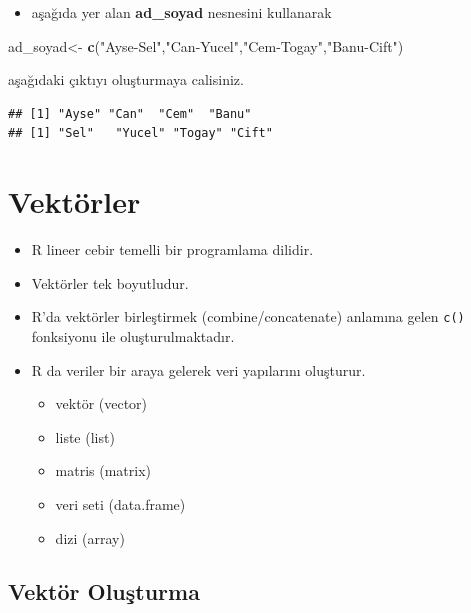 \documentclass[
  oneside]{book}
\newenvironment{Shaded}{\begin{snugshade}}{\end{snugshade}}
\newcommand{\FunctionTok}[1]{\textcolor[rgb]{0.13,0.29,0.53}{\textbf{#1}}}
\newcommand{\NormalTok}[1]{#1}
\newcommand{\OtherTok}[1]{\textcolor[rgb]{0.56,0.35,0.01}{#1}}
\newcommand{\StringTok}[1]{\textcolor[rgb]{0.31,0.60,0.02}{#1}}
\providecommand{\tightlist}{%
  \setlength{\itemsep}{0pt}\setlength{\parskip}{0pt}}
\begin{document}
\begin{itemize}
\tightlist
\item
  aşağıda yer alan \textbf{ad\_soyad} nesnesini kullanarak
\end{itemize}

\begin{Shaded}
\begin{Highlighting}[]
\NormalTok{ad\_soyad}\OtherTok{\textless{}{-}} \FunctionTok{c}\NormalTok{(}\StringTok{"Ayse{-}Sel"}\NormalTok{,}\StringTok{"Can{-}Yucel"}\NormalTok{,}\StringTok{"Cem{-}Togay"}\NormalTok{,}\StringTok{"Banu{-}Cift"}\NormalTok{)}
\end{Highlighting}
\end{Shaded}

aşağıdaki çıktıyı oluşturmaya calisiniz.

\begin{verbatim}
## [1] "Ayse" "Can"  "Cem"  "Banu"
## [1] "Sel"   "Yucel" "Togay" "Cift"
\end{verbatim}

\hypertarget{vektuxf6rler}{%
\chapter{Vektörler}\label{vektuxf6rler}}

\begin{itemize}
\item
  R lineer cebir temelli bir programlama dilidir.
\item
  Vektörler tek boyutludur.
\item
  R'da vektörler birleştirmek (combine/concatenate) anlamına gelen \texttt{c()} fonksiyonu ile oluşturulmaktadır.
\item
  R da veriler bir araya gelerek veri yapılarını oluşturur.

  \begin{itemize}
  \tightlist
  \item
    vektör (vector)
  \item
    liste (list)
  \item
    matris (matrix)
  \item
    veri seti (data.frame)
  \item
    dizi (array)
  \end{itemize}
\end{itemize}

\hypertarget{vektuxf6r-oluux15fturma}{%
\section{Vektör Oluşturma}\label{vektuxf6r-oluux15fturma}}
\end{document}
